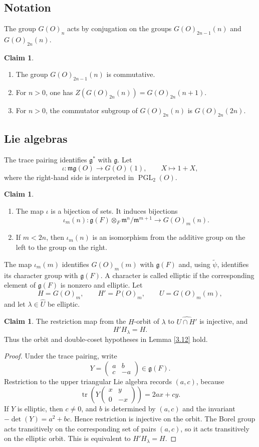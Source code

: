 \documentclass[11pt,a4paper,twoside]{amsart}
\theoremstyle{definition}
\newtheorem{claim}[theorem]{Claim}
\theoremstyle{remark}
\newcommand{\bl}{\lambda}
\newcommand{\fg}{\mathfrak g}
\newcommand{\fm}{\mathfrak m}
\newcommand{\PGL}{\operatorname{PGL}}
\begin{document}
\subsection{Notation}
The group $G(O)_n$ acts by conjugation on the groups $G(O)_{2n-1}(n)$ and $G(O)_{2n}(n)$.
\begin{claim}
\begin{enumerate}
\item The group $G(O)_{2n-1}(n)$ is commutative.
\item For $n>0$, one has $Z(G(O)_{2n}(n))=G(O)_{2n}(n+1)$.
\item For $n>0$, the commutator subgroup of $G(O)_{2n}(n)$ is $G(O)_{2n}(2n)$.
\end{enumerate}
\end{claim}
\subsection{Lie algebras}
The trace pairing identifies $\fg^*$ with $\fg$. Let
$$
\iota:\fm\fg(O)\longrightarrow G(O)(1),\qquad X\longmapsto1+X,
$$
where the right-hand side is interpreted in $\PGL_2(O)$.
\begin{claim}\label{iota1}
\begin{enumerate}
\item The map $\iota$ is a bijection of sets. It induces bijections
$$
\iota_m(n):\fg(F)\otimes_F\fm^n/\fm^{m+1}\longrightarrow G(O)_m(n).
$$
\item If $m<2n$, then $\iota_m(n)$ is an isomorphism from the additive group on the left to the group on the right.
\end{enumerate}
\end{claim}
The map $\iota_m(m)$ identifies $G(O)_m(m)$ with $\fg(F)$ and, using $\widetilde\psi$, identifies its character group with $\fg(F)$. A character is called elliptic if the corresponding element of $\fg(F)$ is nonzero and elliptic.
Let
$$
H=G(O)_m,\qquad H'=P(O)_m,\qquad U=G(O)_m(m),
$$
and let $\bl\in\widehat U$ be elliptic.
\begin{claim}\label{P=G}
The restriction map from the $H$-orbit of $\bl$ to $\widehat{U\cap H'}$ is injective, and
$$
H'H_\bl=H.
$$
Thus the orbit and double-coset hypotheses in Lemma \ref{3.12} hold.
\end{claim}
\begin{proof}
Under the trace pairing, write
$$
Y=\begin{pmatrix}a&b\\c&-a\end{pmatrix}\in\fg(F).
$$
Restriction to the upper triangular Lie algebra records $(a,c)$, because
$$
\operatorname{tr}\left(Y\begin{pmatrix}x&y\\0&-x\end{pmatrix}\right)=2ax+cy.
$$
If $Y$ is elliptic, then $c\neq0$, and $b$ is determined by $(a,c)$ and the invariant $-\det(Y)=a^2+bc$. Hence restriction is injective on the orbit. The Borel group acts transitively on the corresponding set of pairs $(a,c)$, so it acts transitively on the elliptic orbit. This is equivalent to $H'H_\bl=H$.
\end{proof}
\end{document}
